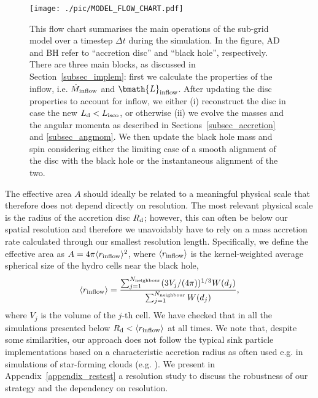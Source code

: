 \documentclass[a4paper,fleqn,usenatbib]{mnras}
\begin{document}
\begin{figure*}
\begin{center}
\texttt{[image: ./pic/MODEL\_FLOW\_CHART.pdf]}
\caption{This flow chart summarises the main operations of the sub-grid model over a timestep $\Delta t$ during the simulation.
In the figure, AD and BH refer to ``accretion disc'' and ``black hole'', respectively.
There are three main blocks, as discussed in Section~\ref{subsec_implem}: first we calculate the properties of the inflow, i.e. $\dot{M}_{\rm inflow}$ and $\bmath{L}_{\rm inflow}$.
After updating the disc properties to account for inflow, we either (i) reconstruct the disc in case the new $L_{\rm d} < L_{\rm isco}$, or otherwise (ii) we evolve the masses and the angular momenta as described in Sections~\ref{subsec_accretion} and \ref{subsec_angmom}.
We then update the black hole mass and spin considering either the limiting case of a smooth alignment of the disc with the black hole or the instantaneous alignment of the two.
}
\label{fig_model_flow_chart}
\end{center}
\end{figure*}

The effective area $A$ should ideally be related to a meaningful physical scale that therefore does not depend directly on resolution.
The most relevant physical scale is the radius of the accretion disc $R_{\rm d}$; however, this can often be below our spatial resolution and therefore we unavoidably have to rely on a mass accretion rate calculated through our smallest resolution length.
Specifically, we define the effective area as $A = 4 \pi \langle r_{\rm inflow} \rangle^2$, where $\langle r_{\rm inflow} \rangle$ is the kernel-weighted average spherical size of the hydro cells near the black hole, 
\begin{equation} \label{eq_r_inflow_SPH}
\langle r_{\rm inflow} \rangle = \frac{\sum_{j=1}^{N_{\rm neighbour}} (3 V_{j}/(4 \pi))^{1/3} W(d_j)}{\sum_{j=1}^{N_{\rm neighbour}} W(d_j)},
\end{equation}
where $V_{j}$ is the volume of the $j$-th cell.
We have checked that in all the simulations presented below $R_{\rm d} < \langle r_{\rm inflow} \rangle$ at all times.
We note that, despite some similarities, our approach does not follow the typical sink particle implementations based on a characteristic accretion radius as often used e.g. in simulations of star-forming clouds (e.g. \citealt{bate+95,federrath+10}).
We present in Appendix~\ref{appendix_restest} a resolution study to discuss the robustness of our strategy and the dependency on resolution. 
\end{document}
